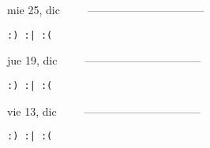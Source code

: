 \documentclass[letterpaper,10pt]{article}
\begin{document}
\begin{multicols}{3}
{mie 25, dic\ \ \ \ \ --------------------------------}
\begin{flushright}\begin{small}\texttt{:) :| :(}\end{small}\end{flushright}
\vfill
{jue 19, dic\ \ \ \ \ --------------------------------}
\begin{flushright}\begin{small}\texttt{:) :| :(}\end{small}\end{flushright}\par
\vfill
{vie 13, dic\ \ \ \ \ --------------------------------}
\begin{flushright}\begin{small}\texttt{:) :| :(}\end{small}\end{flushright}\par
\vfill
\end{multicols}
\vspace{1.05cm}
\end{document}
